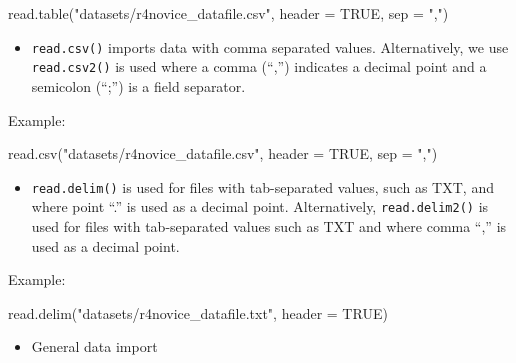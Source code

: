 \documentclass[
  letterpaper,
  DIV=11,
  numbers=noendperiod]{scrreprt}
\newenvironment{Shaded}{}{}
\newcommand{\AttributeTok}[1]{\textcolor[rgb]{0.84,0.23,0.29}{#1}}
\newcommand{\ConstantTok}[1]{\textcolor[rgb]{0.00,0.36,0.77}{#1}}
\newcommand{\FunctionTok}[1]{\textcolor[rgb]{0.44,0.26,0.76}{#1}}
\newcommand{\NormalTok}[1]{\textcolor[rgb]{0.14,0.16,0.18}{#1}}
\newcommand{\StringTok}[1]{\textcolor[rgb]{0.01,0.18,0.38}{#1}}
\providecommand{\tightlist}{%
  \setlength{\itemsep}{0pt}\setlength{\parskip}{0pt}}\usepackage{longtable,booktabs,array}
\begin{document}
\begin{Shaded}
\begin{Highlighting}[]
\FunctionTok{read.table}\NormalTok{(}\StringTok{"datasets/r4novice\_datafile.csv"}\NormalTok{, }\AttributeTok{header =} \ConstantTok{TRUE}\NormalTok{, }\AttributeTok{sep =} \StringTok{","}\NormalTok{)}
\end{Highlighting}
\end{Shaded}

\begin{itemize}
\tightlist
\item
  \texttt{read.csv()} imports data with comma separated values.
  Alternatively, we use \texttt{read.csv2()} is used where a comma
  (``,'') indicates a decimal point and a semicolon (``;'') is a field
  separator.
\end{itemize}

Example:

\begin{Shaded}
\begin{Highlighting}[]
\FunctionTok{read.csv}\NormalTok{(}\StringTok{"datasets/r4novice\_datafile.csv"}\NormalTok{, }\AttributeTok{header =} \ConstantTok{TRUE}\NormalTok{, }\AttributeTok{sep =} \StringTok{","}\NormalTok{)}
\end{Highlighting}
\end{Shaded}

\begin{itemize}
\tightlist
\item
  \texttt{read.delim()} is used for files with tab-separated values,
  such as TXT, and where point ``.'' is used as a decimal point.
  Alternatively, \texttt{read.delim2()} is used for files with
  tab-separated values such as TXT and where comma ``,'' is used as a
  decimal point.
\end{itemize}

Example:

\begin{Shaded}
\begin{Highlighting}[]
\FunctionTok{read.delim}\NormalTok{(}\StringTok{"datasets/r4novice\_datafile.txt"}\NormalTok{, }\AttributeTok{header =} \ConstantTok{TRUE}\NormalTok{)}
\end{Highlighting}
\end{Shaded}

\begin{itemize}
\tightlist
\item
  General data import
\end{itemize}
\end{document}
